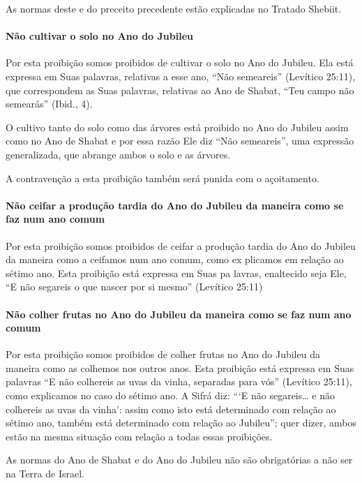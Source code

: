 As normas deste e do preceito precedente estão explicadas no Tratado Shebiit.

\paragraph{Não cultivar o solo no Ano do Jubileu}

Por esta proibição somos proibidos de cultivar o solo no Ano do Jubileu.
Ela está expressa em Suas palavras, relativas a esse ano, ``Não
semeareis'' (Levítico 25:11), que correspondem as Suas palavras,
relativas ao Ano de Shabat, ``Teu campo não semearás'' (Ibid., 4).

O cultivo tanto do solo como das árvores está proibido no Ano do Jubileu
assim como no Ano de Shabat e por essa razão Ele diz ``Não semeareis'',
uma expressão generalizada, que abrange ambos o solo e as árvores.

A contravenção a esta proibição também será punida com o açoitamento.

\paragraph{Não ceifar a produção tardia do Ano do Jubileu da maneira como se
faz num ano comum}

Por esta proibição somos proibidos de ceifar a produção tardia do Ano do
Jubileu da maneira como a ceifamos num ano comum, como ex plicamos em
relação ao sétimo ano. Esta proibição está expressa em Suas pa lavras,
enaltecido seja Ele, ``E não segareis o que nascer por si mesmo''
(Levítico 25:11)

\paragraph{Não colher frutas no Ano do Jubileu da maneira como se faz num ano comum}

Por esta proibição somos proibidos de colher frutas no Ano do Jubileu da
maneira como as colhemos nos outros anos. Esta proibição está expressa
em Suas palavras ``E não colhereis as uvas da vinha, separadas para
vós'' (Levítico 25:11), como explicamos no caso do sétimo ano. A Sifrá
diz: ```E não segareis\ldots{} e não colhereis as uvas da vinha': assim como
isto está determinado com relação ao sétimo ano, também está determinado
com relação ao Jubileu''; quer dizer, ambos estão na mesma situação com
relação a todas essas proibições.

As normas do Ano de Shabat e do Ano do Jubileu não são obrigatórias a
não ser na Terra de Israel.


